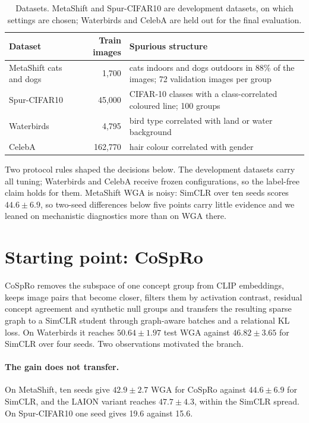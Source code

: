 \documentclass{article}
\begin{document}
\begin{table}[h]
\centering
\caption{Datasets. MetaShift and Spur-CIFAR10 are development datasets, on which settings are chosen;
Waterbirds and CelebA are held out for the final evaluation.}
\label{tab:datasets}
\small
\begin{tabularx}{\linewidth}{l r X}
\toprule
Dataset & Train images & Spurious structure \\
\midrule
MetaShift cats and dogs \citep{liang2022metashift} & 1,700 & cats indoors and dogs outdoors in 88\% of the images; 72 validation images per group \\
Spur-CIFAR10 & 45,000 & CIFAR-10 classes with a class-correlated coloured line; 100 groups \\
Waterbirds \citep{sagawa2020groupdro} & 4,795 & bird type correlated with land or water background \\
CelebA \citep{liu2015celeba} & 162,770 & hair colour correlated with gender \\
\bottomrule
\end{tabularx}
\end{table}

Two protocol rules shaped the decisions below. The development datasets carry all tuning; Waterbirds
and CelebA receive frozen configurations, so the label-free claim holds for them. MetaShift WGA is
noisy: SimCLR over ten seeds scores $44.6\pm6.9$, so two-seed differences below five points carry
little evidence and we leaned on mechanistic diagnostics more than on WGA there.

\section{Starting point: CoSpRo}
\label{sec:cospro}

CoSpRo removes the subspace of one concept group from CLIP embeddings, keeps image pairs that become
closer, filters them by activation contrast, residual concept agreement and synthetic null groups and
transfers the resulting sparse graph to a SimCLR student through graph-aware batches and a relational
KL loss. On Waterbirds it reaches $50.64\pm1.97$ test WGA against $46.82\pm3.65$ for SimCLR over four
seeds. Two observations motivated the branch.

\paragraph{The gain does not transfer.} On MetaShift, ten seeds give $42.9\pm2.7$ WGA for CoSpRo
against $44.6\pm6.9$ for SimCLR, and the LAION variant reaches $47.7\pm4.3$, within the SimCLR spread.
On Spur-CIFAR10 one seed gives 19.6 against 15.6.
\end{document}
